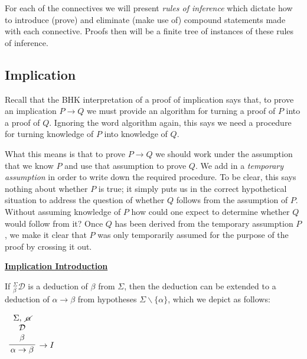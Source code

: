 \documentclass{book}
\begin{document}
    For each of the connectives we will present \emph{rules of inference} which dictate how to introduce (prove) and eliminate (make use of) compound statements made with each connective. Proofs then will be a finite tree of instances of these rules of inference. 

    
    \newpage
    \subsection{Implication}

    Recall that the BHK interpretation of a proof of implication says that, to prove an implication $P \to Q$ we must provide an algorithm for turning a proof of $P$ into a proof of $Q$. Ignoring the word algorithm again, this says we need a procedure for turning knowledge of $P$ into knowledge of $Q$. 

    What this means is that to prove $P \to Q$ we should work under the assumption that we know $P$ and use that assumption to prove $Q$. We add in a \emph{temporary assumption} in order to write down the required procedure. To be clear, this says nothing about whether $P$ is true; it simply puts us in the correct hypothetical situation to address the question of whether $Q$ follows from the assumption of $P$. Without assuming knowledge of $P$ how could one expect to determine whether $Q$ would follow from it? Once $Q$ has been derived from the temporary assumption $P$, we make it clear that $P$ was only temporarily assumed for the purpose of the proof by crossing it out. 

    \vspace{0.1cm}

    \begin{mdframed}

        \underline{{\bf Implication Introduction}}

        If $^{\Sigma}_{\beta}\mathcal{D}$ is a deduction of $\beta$ from $\Sigma$, then the deduction can be extended to a deduction of $\alpha \rightarrow \beta$ from hypotheses $\Sigma \backslash \{\alpha\}$, which we depict as follows: 

        \begin{center}
            $\begin{array}{c}		
                \infer[\rightarrow I]{\alpha \rightarrow \beta}
                    {\begin{array}{c} \Sigma, \ \cancel{\alpha} \\ \mathcal{D} \\ \beta \end{array}}
            \end{array}$
        \end{center}
    \end{mdframed}
\end{document}
